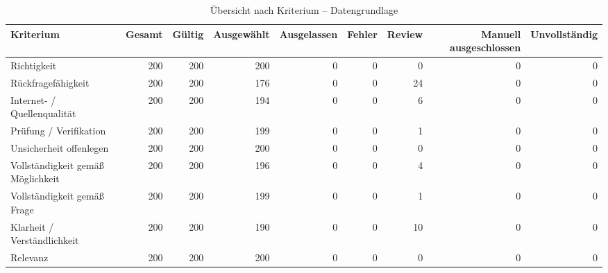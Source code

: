 \begin{table}[htbp]
\centering
\caption{Übersicht nach Kriterium -- Datengrundlage}
\begin{tabular}{lrrrrrrrr}
\toprule
Kriterium & Gesamt & Gültig & Ausgewählt & Ausgelassen & Fehler & Review & Manuell ausgeschlossen & Unvollständig \\
\midrule
Richtigkeit & 200 & 200 & 200 & 0 & 0 & 0 & 0 & 0 \\
Rückfragefähigkeit & 200 & 200 & 176 & 0 & 0 & 24 & 0 & 0 \\
Internet- / Quellenqualität & 200 & 200 & 194 & 0 & 0 & 6 & 0 & 0 \\
Prüfung / Verifikation & 200 & 200 & 199 & 0 & 0 & 1 & 0 & 0 \\
Unsicherheit offenlegen & 200 & 200 & 200 & 0 & 0 & 0 & 0 & 0 \\
Vollständigkeit gemäß Möglichkeit & 200 & 200 & 196 & 0 & 0 & 4 & 0 & 0 \\
Vollständigkeit gemäß Frage & 200 & 200 & 199 & 0 & 0 & 1 & 0 & 0 \\
Klarheit / Verständlichkeit & 200 & 200 & 190 & 0 & 0 & 10 & 0 & 0 \\
Relevanz & 200 & 200 & 200 & 0 & 0 & 0 & 0 & 0 \\
\bottomrule
\end{tabular}
\end{table}
